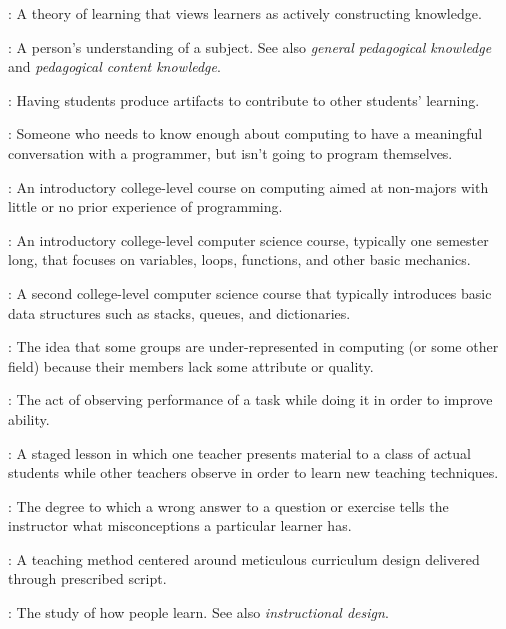 \begin{description}
: A theory of learning that views
learners as actively constructing knowledge.

: A person's understanding of a
subject. See also \emph{general pedagogical knowledge} and \emph{pedagogical
  content knowledge}.

: Having students
produce artifacts to contribute to other students' learning.

: Someone who
needs to know enough about computing to have a meaningful conversation with a
programmer, but isn't going to program themselves.

: An introductory college-level course on computing aimed at
non-majors with little or no prior experience of programming.

: An introductory college-level computer science course,
typically one semester long, that focuses on variables, loops, functions, and
other basic mechanics.

: A second college-level computer science course that
typically introduces basic data structures such as stacks, queues, and
dictionaries.

: The idea that some groups are
under-represented in computing (or some other field) because their members lack
some attribute or quality.

: The act of observing
performance of a task while doing it in order to improve ability.

: A staged lesson in which
one teacher presents material to a class of actual students while other teachers
observe in order to learn new teaching techniques.

: The degree to which a wrong answer
to a question or exercise tells the instructor what misconceptions a particular
learner has.

: A teaching method centered
around meticulous curriculum design delivered through prescribed script.

: The study of how
people learn. See also \emph{instructional design}.


\end{description}
